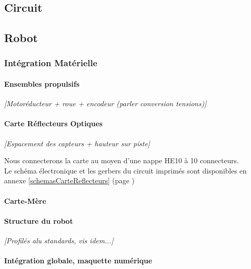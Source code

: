  \subsection{Circuit}


\subsection{Robot}

	\subsubsection{Intégration Matérielle}

		\paragraph{Ensembles propulsifs}

			\textit{[Motoréducteur + roue + encodeur (parler conversion tensions)]}

		\paragraph{Carte Réflecteurs Optiques}\label{integrationReflecteurs}



			\textit{[Espacement des capteurs + hauteur sur piste]}




			Nous connecterons la carte au moyen d'une nappe HE10 à 10 connecteurs.\\

			Le schéma électronique et les gerbers du circuit imprimés sont disponibles en annexe \ref{schemasCarteReflecteurs} (page \pageref{schemasCarteReflecteurs})

		\paragraph{Carte-Mère}\label{carteMere}


		\paragraph{Structure du robot}


			\textit{[Profilés alu standards, vis idem...]}


		\paragraph{Intégration globale, maquette numérique}

